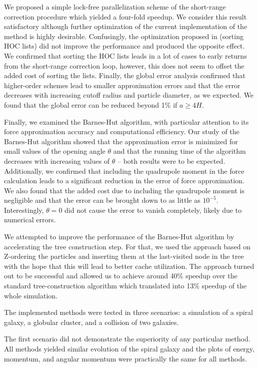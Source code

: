 We proposed a simple lock-free parallelization scheme of the short-range correction procedure which yielded a four-fold speedup.
We consider this result satisfactory although further optimization of the current implementation of the \PThreeM{} method is highly desirable.
Confusingly, the optimization proposed in \cite{Hockney1988} (sorting HOC lists) did not improve the performance and produced the opposite effect.
We confirmed that sorting the HOC lists leads in a lot of cases to early returns from the short-range correction loop, however, this does not seem to offset the added cost of sorting the lists.
Finally, the global error analysis confirmed that higher-order schemes lead to smaller approximation errors and that the error decreases with increasing cutoff radius and particle diameter, as we expected.
We found that the global error can be reduced beyond 1\% if $a \geq 4 H$.

Finally, we examined the Barnes-Hut algorithm, with particular attention to its force approximation accuracy and computational efficiency.
Our study of the Barnes-Hut algorithm showed that the approximation error is minimized for small values of the opening angle $\theta$ and that the running time of the algorithm decreases with increasing values of $\theta$ -- both results were to be expected.
Additionally, we confirmed that including the quadrupole moment in the force calculation leads to a significant reduction in the error of force approximation.
We also found that the added cost due to including the quadrupole moment is negligible and that the error can be brought down to as little as $10^{-5}$.
Interestingly, $\theta = 0$ did not cause the error to vanish completely, likely due to numerical errors.

We attempted to improve the performance of the Barnes-Hut algorithm by accelerating the tree construction step.
For that, we used the approach based on Z-ordering the particles and inserting them at the last-visited node in the tree with the hope that this will lead to better cache utilization.
The approach turned out to be successful and allowed us to achieve around 40\% speedup over the standard tree-construction algorithm which translated into 13\% speedup of the whole simulation.

The implemented methods were tested in three scenarios: a simulation of a spiral galaxy, a globular cluster, and a collision of two galaxies.

The first scenario did not demonstrate the superiority of any particular method.
All methods yielded similar evolution of the spiral galaxy and the plots of energy, momentum, and angular momentum were practically the same for all methods.

